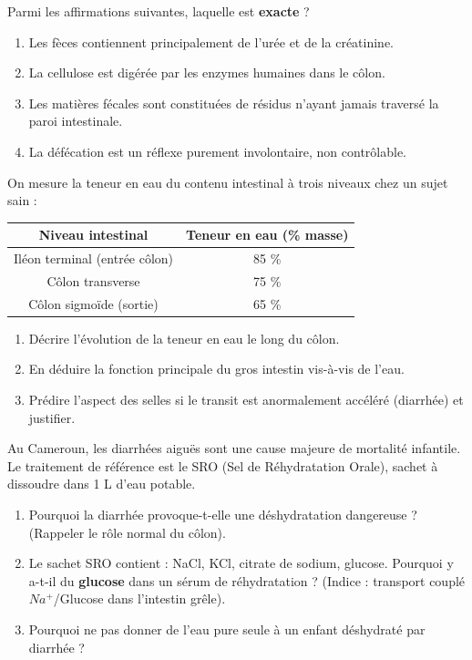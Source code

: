 \documentclass[11pt]{article}
\newcounter{popsec}
\newcounter{popsub}
\newcommand{\courssub}[1]{%
  \stepcounter{popsub}%
  \par\vspace{9pt}\noindent{\popxbold\fontsize{11.5}{13}\selectfont\color{popink}{\color{poporange}\thepopsec.\thepopsub}\hspace{6pt}#1}\par\nopagebreak\vspace{4pt}
}
\begin{document}
\courssub{Exercices d'entraînement}

\begin{exercice}
Parmi les affirmations suivantes, laquelle est \textbf{exacte} ?
\begin{enumerate}
    \item Les fèces contiennent principalement de l'urée et de la créatinine.
    \item La cellulose est digérée par les enzymes humaines dans le côlon.
    \item Les matières fécales sont constituées de résidus n'ayant jamais traversé la paroi intestinale.
    \item La défécation est un réflexe purement involontaire, non contrôlable.
\end{enumerate}
\end{exercice}

\begin{exercice}
On mesure la teneur en eau du contenu intestinal à trois niveaux chez un sujet sain :
\begin{center}
\begin{tabular}{|c|c|}
\hline
\textbf{Niveau intestinal} & \textbf{Teneur en eau (\% masse)} \\
\hline
Iléon terminal (entrée côlon) & 85 \% \\
\hline
Côlon transverse & 75 \% \\
\hline
Côlon sigmoïde (sortie) & 65 \% \\
\hline
\end{tabular}
\end{center}
\begin{enumerate}
    \item Décrire l'évolution de la teneur en eau le long du côlon.
    \item En déduire la fonction principale du gros intestin vis-à-vis de l'eau.
    \item Prédire l'aspect des selles si le transit est anormalement accéléré (diarrhée) et justifier.
\end{enumerate}
\end{exercice}

\begin{exercice}
Au Cameroun, les diarrhées aiguës sont une cause majeure de mortalité infantile. Le traitement de référence est le SRO (Sel de Réhydratation Orale), sachet à dissoudre dans 1 L d'eau potable.
\begin{enumerate}
    \item Pourquoi la diarrhée provoque-t-elle une déshydratation dangereuse ? (Rappeler le rôle normal du côlon).
    \item Le sachet SRO contient : NaCl, KCl, citrate de sodium, glucose. Pourquoi y a-t-il du \textbf{glucose} dans un sérum de réhydratation ? (Indice : transport couplé $Na^+$/Glucose dans l'intestin grêle).
    \item Pourquoi ne pas donner de l'eau pure seule à un enfant déshydraté par diarrhée ?
\end{enumerate}
\end{exercice}
\end{document}
